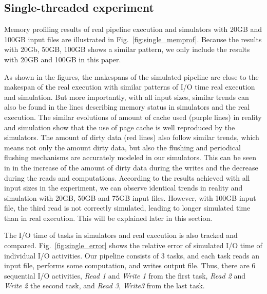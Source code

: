 \documentclass[conference]{IEEEtran}
\begin{document}
        \subsection{Single-threaded experiment}

            Memory profiling results of real pipeline execution and simulators 
			with 20GB and 100GB input files are illustrated in Fig.~\ref{fig:single_memprof}.
			Because the results with 20Gb, 50GB, 100GB shows a similar pattern,
			we only include the results with 20GB and 100GB in this paper.

			As shown in the figures, the makespans of the simulated pipeline are
			close to the makespan of the real execution with similar patterns of I/O time
			real execution and simulation.
			But more importantly, with all input sizes, similar trends can also be found
			in the lines describing memory status in simulators and the real execution.
			The similar evolutions of amount of cache used (purple lines) in reality
			and simulation show that the use of page cache is well reproduced by the simulators.
			The amount of dirty data (red lines) also follow similar trends,
			which means not only the amount dirty data, but also the flushing and
			periodical flushing mechanisms are accurately modeled in our simulators.
			This can be seen in in the increase of the amount of dirty data during the writes
			and the decrease during the reads and computations.
			According to the results achieved with all input sizes in the experiment,
			we can observe identical trends in reality and simulation with 20GB,
			50GB and 75GB input files. However, with 100GB input file,
			the third read is not correctly simulated, leading to longer simulated time
			than in real execution. This will be explained later in this section.

			The I/O time of tasks in simulators and real execution is also tracked and compared.
			Fig.~\ref{fig:single_error} shows the relative error of simulated I/O time
			of individual I/O activities.
			Our pipeline consists of 3 tasks, and each task reads an input file,
			performs some computation, and writes output file.
			Thus, there are 6 sequential I/O activities, \textit{Read 1} and \textit{Write 1}
			from the first task, \textit{Read 2} and \textit{Write 2} the second task,
			and \textit{Read 3}, \textit{Write3} from the last task.
\end{document}
